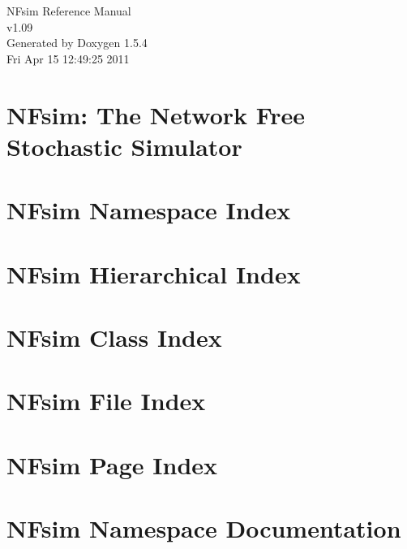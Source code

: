 \documentclass[a4paper]{book}
\begin{document}
\begin{titlepage}
\vspace*{7cm}
\begin{center}
{\Large NFsim Reference Manual\\[1ex]\large v1.09 }\\
\vspace*{1cm}
{\large Generated by Doxygen 1.5.4}\\
\vspace*{0.5cm}
{\small Fri Apr 15 12:49:25 2011}\\
\end{center}
\end{titlepage}
\clearemptydoublepage
{}
\tableofcontents
\clearemptydoublepage
{}
\chapter{NFsim: The Network Free Stochastic Simulator }
\label{index}
\chapter{NFsim Namespace Index}

\chapter{NFsim Hierarchical Index}

\chapter{NFsim Class Index}

\chapter{NFsim File Index}

\chapter{NFsim Page Index}

\chapter{NFsim Namespace Documentation}









\end{document}
